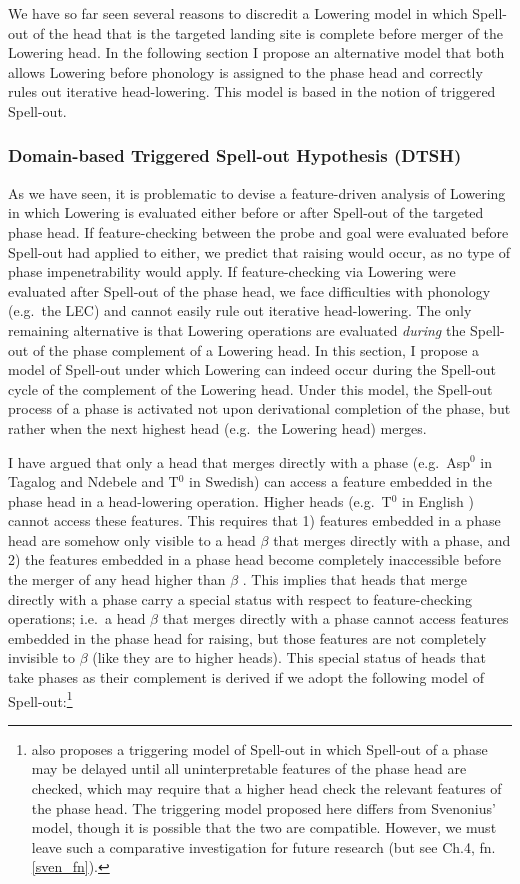 We have so far seen several reasons to discredit a Lowering model in which Spell-out of the head that is the targeted landing site is complete before merger of the Lowering head. In the following section I propose an alternative model that both allows Lowering before phonology is assigned to the phase head and correctly rules out iterative head-lowering. This model is based in the notion of triggered Spell-out.

\subsubsection{Domain-based Triggered Spell-out Hypothesis (DTSH)}\label{DTSH_sec}
As we have seen, it is problematic to devise a feature-driven analysis of Lowering in which Lowering is evaluated either before or after Spell-out of the targeted phase head. If feature-checking between the probe and goal were evaluated before Spell-out had applied to either, we predict that raising would occur, as no type of phase impenetrability would apply. If feature-checking via Lowering were evaluated after Spell-out of the phase head, we face difficulties with phonology (e.g.\ the LEC) and cannot easily rule out iterative head-lowering. The only remaining alternative is that Lowering operations are evaluated {\it during} the Spell-out of the phase complement of a Lowering head. In this section, I propose a model of Spell-out under which Lowering can indeed occur during the Spell-out cycle of the complement of the Lowering head. Under this model, the Spell-out process of a phase is activated not upon derivational completion of the phase, but rather when the next highest head (e.g.\ the Lowering head) merges.

I have argued that only a head that merges directly with a phase (e.g.\ Asp$^{0}$ in Tagalog and Ndebele and T$^{0}$ in Swedish) can access a feature embedded in the phase head in a head-lowering operation. Higher heads (e.g.\ T$^{0}$ in English \Last) cannot access these features. This requires that 1) features embedded in a phase head are somehow only visible to a head $\beta$ that merges directly with a phase, and 2) the features embedded in a phase head become completely inaccessible before the merger of any head higher than $\beta$ . This implies that heads that merge directly with a phase carry a special status with respect to feature-checking operations; i.e.\ a head $\beta$ that merges directly with a phase cannot access features embedded in the phase head for raising, but those features are not completely invisible to $\beta$ (like they are to higher heads). This special status of heads that take phases as their complement is derived if we adopt the following model of Spell-out:\footnote{\citet{svenonius2004} also proposes a triggering model of Spell-out in which Spell-out of a phase may be delayed until all uninterpretable features of the phase head are checked, which may require that a higher head check the relevant features of the phase head. The triggering model proposed here differs from Svenonius' model, though it is possible that the two are compatible. However, we must leave such a comparative investigation for future research (but see Ch.4, fn.\ref{sven_fn}).}

